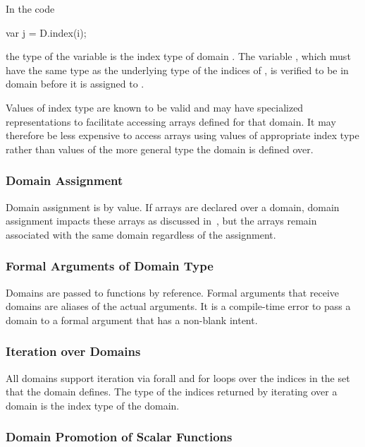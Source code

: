 \begin{example}
In the code
\begin{chapel}
var j = D.index(i);
\end{chapel}
the type of the variable  is the index type of
domain .  The variable , which must have the same type
as the underlying type of the indices of , is verified to be
in domain  before it is assigned to .
\end{example}

Values of index type are known to be valid and may have specialized
representations to facilitate accessing arrays defined for that
domain. It may therefore be less expensive to access arrays using
values of appropriate index type rather than values of the more
general type the domain is defined over.

\subsubsection{Domain Assignment}
\label{Domain_Assignment}

Domain assignment is by value.  If arrays are declared over a domain,
domain assignment impacts these arrays as discussed
in~, but the arrays remain
associated with the same domain regardless of the assignment.

\subsubsection{Formal Arguments of Domain Type}
\label{Formal_Arguments_of_Domain_Type}

Domains are passed to functions by reference.  Formal arguments that
receive domains are aliases of the actual arguments.  It is a
compile-time error to pass a domain to a formal argument that has a
non-blank intent.

\subsubsection{Iteration over Domains}
\label{Iteration_over_Domains}

All domains support iteration via forall and for loops over the
indices in the set that the domain defines.  The type of the indices
returned by iterating over a domain is the index type of the domain.

\subsubsection{Domain Promotion of Scalar Functions}
\label{Domain_Promotion_of_Scalar_Functions}

